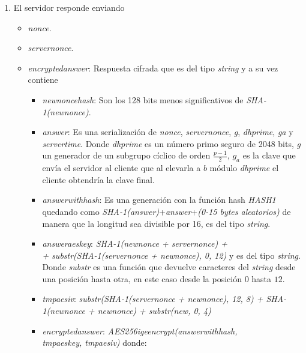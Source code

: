 \begin{enumerate}
	\item El servidor responde enviando
		\begin{itemize}
			\item \emph{nonce}.
			\item \emph{server\textunderscore nonce}.
			\item \emph{encrypted\textunderscore answer}: Respuesta cifrada que es del tipo \emph{string} y a su vez contiene
			\begin{itemize}
				\item \emph{new\textunderscore nonce\textunderscore hash}: Son los 128 bits menos significativos de \emph{SHA-1(new\textunderscore nonce)}.
				\item \emph{answer}: Es una serialización de \emph{nonce}, \emph{server\textunderscore nonce}, \emph{g}, \emph{dh\textunderscore prime}, \emph{g\textunderscore a} y \emph{server\textunderscore time}. Donde \emph{dh\textunderscore prime} es un número primo seguro de 2048 bits, \emph{g} un generador de un subgrupo cíclico de orden $\frac{p-1}{2}$, $g_a$ es la clave que envía el servidor al cliente que al elevarla a $b$ módulo \emph{dh\textunderscore prime} el cliente obtendría la clave final.
\item \emph{answer\textunderscore with\textunderscore hash}: Es una generación con la función hash \emph{HASH1} quedando como \emph{SHA-1(answer)}+\emph{answer}+\emph{(0-15 bytes aleatorios)} de manera que la longitud sea divisible por 16, es del tipo \emph{string}.
				\item \emph{answer\textunderscore aes\textunderscore key}: \emph{SHA-1(new\textunderscore nonce + server\textunderscore nonce) +\\+ substr(SHA-1(server\textunderscore nonce + new\textunderscore nonce), 0, 12)} y es del tipo \emph{string}. Donde \emph{substr} es una función que devuelve caracteres del \emph{string} desde una posición hasta otra, en este caso desde la posición $0$ hasta $12$.
				\item \emph{tmp\textunderscore aes\textunderscore iv}: \emph{substr(SHA-1(server\textunderscore nonce + new\textunderscore nonce), 12, 8) + SHA-1(new\textunderscore nonce + new\textunderscore nonce) + substr(new\textunderscore, 0, 4)}
				\item \emph{encrypted\textunderscore answer}: \emph{AES256\textunderscore ige\textunderscore encrypt(answer\textunderscore with\textunderscore hash,\\ tmp\textunderscore aes\textunderscore key, tmp\textunderscore aes\textunderscore iv)} donde:

\end{itemize}
\end{itemize}
\end{enumerate}
